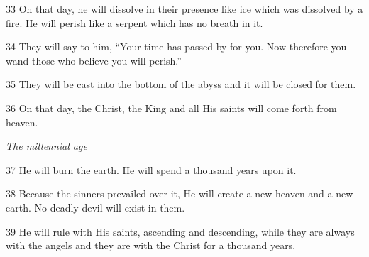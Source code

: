 \par 33 On that day, he will dissolve in their presence like ice which was dissolved by a fire. He will perish like a serpent which has no breath in it.

\par 34 They will say to him, “Your time has passed by for you. Now therefore you wand those who believe you will perish.”

\par 35 They will be cast into the bottom of the abyss and it will be closed for them.

\par 36 On that day, the Christ, the King and all His saints will come forth from heaven.

\par \textit{The millennial age}

\par 37 He will burn the earth. He will spend a thousand years upon it.

\par 38 Because the sinners prevailed over it, He will create a new heaven and a new earth. No deadly devil will exist in them.

\par 39 He will rule with His saints, ascending and descending, while they are always with the angels and they are with the Christ for a thousand years.


